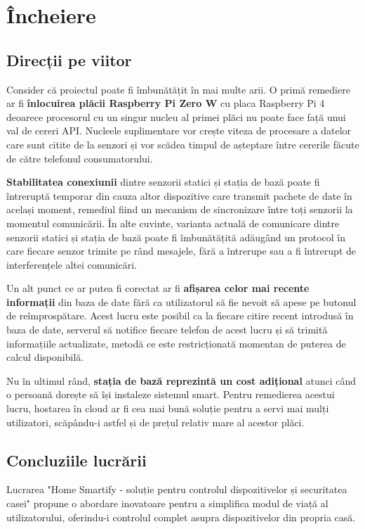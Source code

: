 \chapter*{Încheiere} 

\section*{Direcții pe viitor}

Consider că proiectul poate fi îmbunătățit în mai multe arii. O primă remediere ar fi \textbf{înlocuirea plăcii Raspberry Pi Zero W} cu placa Raspberry Pi 4 deoarece procesorul cu un singur nucleu al primei plăci nu poate face față unui val de cereri API. Nucleele suplimentare vor crește viteza de procesare a datelor care sunt citite de la senzori și vor scădea timpul de așteptare între cererile făcute de către telefonul consumatorului.

\textbf{Stabilitatea conexiunii} dintre senzorii statici și stația de bază poate fi întreruptă temporar din cauza altor dispozitive care transmit pachete de date în același moment, remediul fiind un mecanism de sincronizare între toți senzorii la momentul comunicării. În alte cuvinte, varianta actuală de comunicare dintre senzorii statici și stația de bază poate fi îmbunătățită adăugând un protocol în care fiecare senzor trimite pe rând mesajele, fără a întrerupe sau a fi întrerupt de interferențele altei comunicări.

Un alt punct ce ar putea fi corectat ar fi \textbf{afișarea celor mai recente informații} din baza de date fără ca utilizatorul să fie nevoit să apese pe butonul de reîmprospătare. Acest lucru este posibil ca la fiecare citire recent introdusă în baza de date, serverul să notifice fiecare telefon de acest lucru și să trimită informațiile actualizate, metodă ce este restricționată momentan de puterea de calcul disponibilă.

Nu în ultimul rând, \textbf{stația de bază reprezintă un cost adițional} atunci când o persoană dorește să își instaleze sistemul smart. Pentru remedierea acestui lucru, hostarea în cloud ar fi cea mai bună soluție pentru a servi mai mulți utilizatori, scăpându-i astfel și de prețul relativ mare al acestor plăci.

\section*{Concluziile lucrării}

Lucrarea "Home Smartify - soluție pentru controlul dispozitivelor și securitatea casei" propune o abordare inovatoare pentru a simplifica modul de viață al utilizatorului, oferindu-i controlul complet asupra dispozitivelor din propria casă. 

